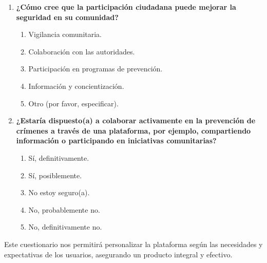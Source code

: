 \documentclass{article}
\begin{document}
\begin{enumerate}[label=\arabic*.]
            \item \textbf{¿Cómo cree que la participación ciudadana puede mejorar la seguridad en su comunidad?}
                \begin{enumerate}[label=\alph*.]
                    \item Vigilancia comunitaria.
                    \item Colaboración con las autoridades.
                    \item Participación en programas de prevención.
                    \item Información y concientización.
                    \item Otro (por favor, especificar).
                \end{enumerate}

            \item \textbf{¿Estaría dispuesto(a) a colaborar activamente en la prevención de crímenes a través de una plataforma, por ejemplo, compartiendo información o participando en iniciativas comunitarias?}
                \begin{enumerate}[label=\alph*.]
                    \item Sí, definitivamente.
                    \item Sí, posiblemente.
                    \item No estoy seguro(a).
                    \item No, probablemente no.
                    \item No, definitivamente no.
                \end{enumerate}

        \end{enumerate}
Este cuestionario nos permitirá personalizar la plataforma según las necesidades y expectativas de los usuarios, asegurando un producto integral y efectivo.
\end{document}
